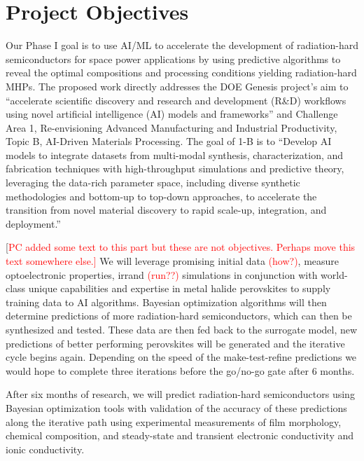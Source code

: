 \documentclass[pgs]{DOE}
\newcommand{\mnote}[1]{{\marginpar{\color{red} #1}}}
\newcommand{\myclearpage}{\clearpage}
\begin{document}
\myclearpage
\section{Project Objectives}
\mnote{0.5 page}
% 
%

Our Phase I goal is to use AI/ML to accelerate the development of radiation-hard semiconductors for space power applications by using predictive algorithms to reveal the optimal compositions and processing conditions yielding radiation-hard MHPs. 
The proposed work directly addresses the DOE Genesis project's aim to ``accelerate scientific discovery and research and development (R\&D) workflows using novel artificial intelligence (AI) models and frameworks'' and Challenge Area 1, Re-envisioning Advanced Manufacturing and Industrial Productivity, Topic B, AI-Driven Materials Processing. The goal of 1-B is to ``Develop AI models to integrate datasets from multi-modal synthesis, characterization, and fabrication techniques with high-throughput simulations and predictive theory, leveraging the data-rich parameter space, including diverse synthetic methodologies and bottom-up to top-down approaches, to accelerate the transition from novel material discovery to rapid scale-up, integration, and deployment.''

[\textcolor{red}{PC added some text to this part but these are not objectives. Perhaps move this text somewhere else.]}
We will leverage promising initial data \textcolor{red}{(how?)}, measure optoelectronic properties, irrand \textcolor{red}{(run??)} simulations in conjunction with world-class unique capabilities and expertise in metal halide perovskites to supply training data to AI algorithms. Bayesian optimization algorithms will then determine predictions of more radiation-hard semiconductors, which can then be synthesized and tested. These data are then fed back to the surrogate model, new predictions of better performing perovskites will be generated  and the iterative cycle begins again. Depending on the speed of the {make-test-refine predictions} we would hope to complete three iterations before the go/no-go gate after 6 months.



\begin{tcolorbox}[colframe=gray, colback=gray!10, coltext=black]
After six months of research, we will predict radiation-hard semiconductors using Bayesian optimization tools with validation of the accuracy of these predictions along the iterative path using experimental measurements of film morphology, chemical composition, and steady-state and transient electronic conductivity and ionic conductivity.
\end{tcolorbox}
\end{document}
